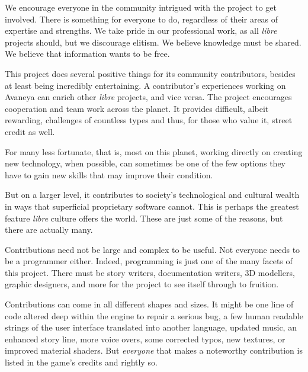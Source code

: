 
We encourage everyone in the community intrigued with the project to get involved. There is something for everyone to do, regardless of their areas of expertise and strengths. We take pride in our professional work, as all {\it libre} projects should, but we discourage elitism. We believe knowledge must be shared. We believe that information wants to be free.
    {}

This project does several positive things for its community contributors, besides at least being incredibly entertaining. A contributor's experiences working on Avaneya can enrich other {\it libre} projects, and vice versa. The project encourages cooperation and team work across the planet. It provides difficult, albeit rewarding, challenges of countless types and thus, for those who value it, street credit as well. 

For many less fortunate, that is, most on this planet, working directly on creating new technology, when possible, can sometimes be one of the few options they have to gain new skills that may improve their condition.

But on a larger level, it contributes to society's technological and cultural wealth in ways that superficial proprietary software cannot. This is perhaps the greatest feature {\it libre} culture offers the world. These are just some of the reasons, but there are actually many.

Contributions need not be large and complex to be useful. Not everyone needs to be a programmer either. Indeed, programming is just one of the many facets of this project. There must be story writers, documentation writers, 3D modellers, graphic designers, and more for the project to see itself through to fruition. 

Contributions can come in all different shapes and sizes. It might be one line of code altered deep within the engine to repair a serious bug, a few human readable strings of the user interface translated into another language, updated music, an enhanced story line, more voice overs, some corrected typos, new textures, or improved material shaders. But {\it everyone} that makes a noteworthy contribution is listed in the game's credits and rightly so.

